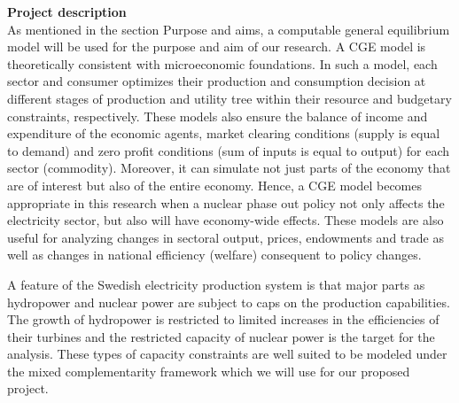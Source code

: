 \textbf{Project description}\\
As mentioned in the section Purpose and aims, a computable general equilibrium model will be used for the purpose and aim of our research. A CGE model is theoretically consistent with microeconomic foundations. In such a model, each sector and consumer optimizes their production and consumption decision at different stages of production and utility tree within their resource and budgetary constraints, respectively. These models also ensure the balance of income and expenditure of the economic agents, market clearing conditions (supply is equal to demand) and zero profit conditions (sum of inputs is equal to output) for each sector (commodity). Moreover, it can simulate not just parts of the economy that are of interest but also of the entire economy. Hence, a CGE model becomes appropriate in this research when a nuclear phase out policy not only affects the electricity sector, but also will have economy-wide effects. These models are also useful for analyzing changes in sectoral output, prices, endowments and trade as well as changes in national efficiency (welfare) consequent to policy changes.

A feature of the Swedish electricity production system is that major parts as hydropower and nuclear power are subject to caps on the production capabilities. The growth of hydropower is restricted to limited increases in the efficiencies of their turbines and the restricted capacity of nuclear power is the target for the analysis. These types of capacity constraints are well suited to be modeled under the mixed complementarity framework \citep{raey} which we will use for our proposed project.

